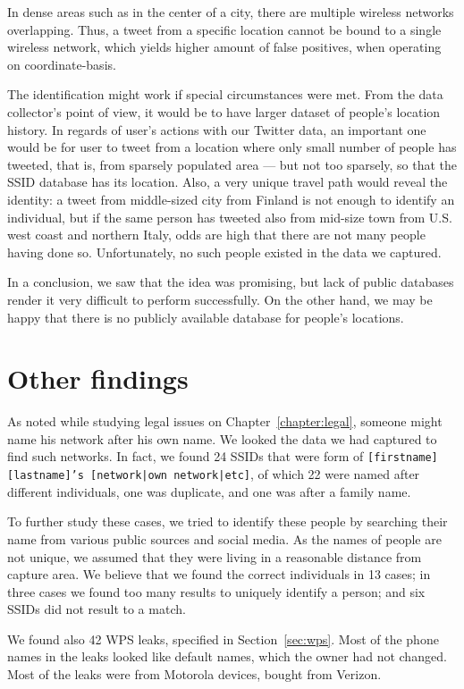 \documentclass[12pt,a4paper,oneside,pdftex]{report}
\begin{document}
In dense areas such as in the center of a city, there are multiple wireless networks overlapping. Thus, a tweet from a specific location cannot be bound to a single wireless network, which yields higher amount of false positives, when operating on coordinate-basis.

The identification might work if special circumstances were met. From the data collector's point of view, it would be to have larger dataset of people's location history. In regards of user's actions with our Twitter data, an important one would be for user to tweet from a location where only small number of people has tweeted, that is, from sparsely populated area --- but not too sparsely, so that the SSID database has its location. Also, a very unique travel path would reveal the identity: a tweet from middle-sized city from Finland is not enough to identify an individual, but if the same person has tweeted also from mid-size town from U.S. west coast and northern Italy, odds are high that there are not many people having done so. Unfortunately, no such people existed in the data we captured.

In a conclusion, we saw that the idea was promising, but lack of public databases render it very difficult to perform successfully. On the other hand, we may be happy that there is no publicly available database for people's locations.

\section{Other findings}
\label{sec:practical_other}

As noted while studying legal issues on Chapter~\ref{chapter:legal}, someone might name his network after his own name. We looked the data we had captured to find such networks. In fact, we found 24 SSIDs that were form of \texttt{[firstname] [lastname]'s [network|own network|etc]}, of which 22 were named after different individuals, one was duplicate, and one was after a family name.

To further study these cases, we tried to identify these people by searching their name from various public sources and social media. As the names of people are not unique, we assumed that they were living in a reasonable distance from capture area. We believe that we found the correct individuals in 13 cases; in three cases we found too many results to uniquely identify a person; and six SSIDs did not result to a match.

We found also 42 WPS leaks, specified in Section~\ref{sec:wps}. Most of the phone names in the leaks looked like default names, which the owner had not changed. Most of the leaks were from Motorola devices, bought from Verizon.
\end{document}
